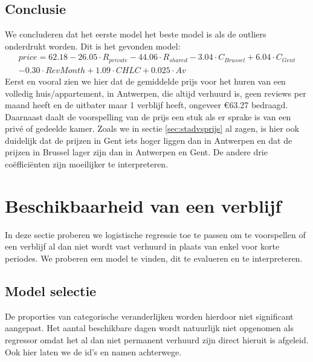 \documentclass[a4paper,kulak]{kulakarticle} %
\begin{document}
\subsection{Conclusie}
We concluderen dat het eerste model het beste model is als de outliers onderdrukt worden. Dit is het gevonden model:
\begin{multline}
price = 62.18 - 26.05\cdot R_{private}  - 44.06\cdot R_{shared}  - 3.04\cdot C_{Brussel} + 6.04\cdot C_{Gent} \\ - 0.30\cdot RevMonth + 1.09\cdot CHLC + 0.025 \cdot Av 
\end{multline}
Eerst en vooral zien we hier dat de gemiddelde prijs voor het huren van een volledig huis/appartement, in Antwerpen, die altijd verhuurd is, geen reviews per maand heeft en de uitbater maar 1 verblijf heeft, ongeveer \euro  63.27 bedraagd. Daarnaast daalt de voorspelling van de prijs een stuk als er sprake is van een priv\'e of gedeelde kamer. Zoals we in sectie \ref{sec:stadvsprijs} al zagen, is hier ook duidelijk dat de prijzen in Gent iets hoger liggen dan in Antwerpen en dat de prijzen in Brussel lager zijn dan in Antwerpen en Gent. De andere drie co\"effici\"enten zijn moeilijker te interpreteren.

\section{Beschikbaarheid van een verblijf}
In deze sectie proberen we logistische regressie toe te passen om te voorspellen of een verblijf al dan niet wordt vast verhuurd in plaats van enkel voor korte periodes.
We proberen een model te vinden, dit te evalueren en te interpreteren.
\subsection{Model selectie}
De proporties van categorische veranderlijken worden hierdoor niet significant aangepast.
Het aantal beschikbare dagen wordt natuurlijk niet opgenomen als regressor omdat het al dan niet permanent verhuurd zijn direct hieruit is afgeleid. Ook hier laten we de id's en namen achterwege.
\end{document}
